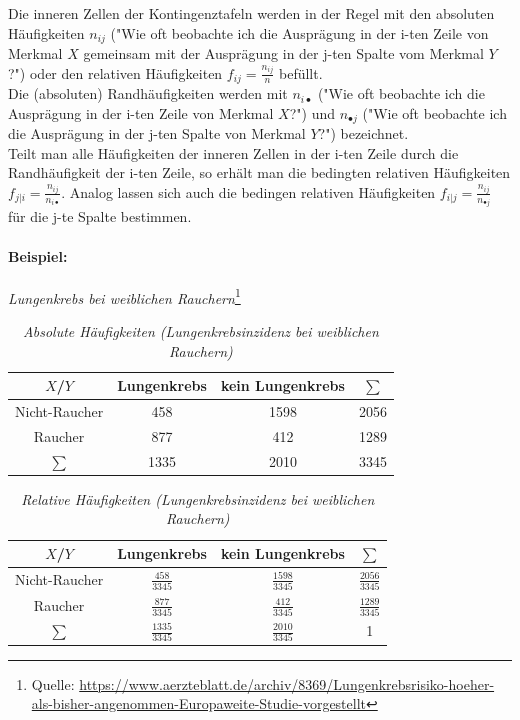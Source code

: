 \documentclass[a4paper]{article}
\begin{document}
Die inneren Zellen der Kontingenztafeln werden in der Regel mit den absoluten Häufigkeiten $n_{ij}$ ("Wie oft beobachte ich die Ausprägung in der i-ten Zeile von Merkmal $X$ gemeinsam mit der Ausprägung in der j-ten Spalte vom Merkmal $Y$?") oder den relativen Häufigkeiten $f_{ij} = \frac{n_{ij}}{n}$ befüllt.\\
Die (absoluten) Randhäufigkeiten werden mit $n_{i\bullet}$ ("Wie oft beobachte ich die Ausprägung in der i-ten Zeile von Merkmal $X$?") und $n_{\bullet j}$ ("Wie oft beobachte ich die Ausprägung in der j-ten Spalte von Merkmal $Y$?") bezeichnet.\\
Teilt man alle Häufigkeiten der inneren Zellen in der i-ten Zeile durch die Randhäufigkeit der i-ten Zeile, so erhält man die bedingten relativen Häufigkeiten $f_{j|i} = \frac{n_{ij}}{n_{i\bullet}}$. Analog lassen sich auch die bedingen relativen Häufigkeiten $f_{i|j} = \frac{n_{ij}}{n_{\bullet j}}$ für die j-te Spalte bestimmen.

\noindent \paragraph{Beispiel:} \textit{Lungenkrebs bei weiblichen Rauchern}\footnote{Quelle: \tiny{\url{https://www.aerzteblatt.de/archiv/8369/Lungenkrebsrisiko-hoeher-als-bisher-angenommen-Europaweite-Studie-vorgestellt}}}\\

\begin{table}[htbp]
\begin{tabular}{c|cc|c}
    $X$/$Y$         & Lungenkrebs & kein Lungenkrebs & $\sum$ \\
     \hline
    Nicht-Raucher   & 458         & 1598             & 2056 \\
    Raucher         & 877         & 412              & 1289 \\
    \hline
    $\sum$          & 1335        & 2010             & 3345
\end{tabular}
    \caption{\textit{Absolute Häufigkeiten (Lungenkrebsinzidenz bei weiblichen Rauchern)}}
    \label{tab:abs}
\end{table}

\begin{table}[htbp]
\begin{tabular}{c|cc|c}
    $X$/$Y$         & Lungenkrebs & kein Lungenkrebs & $\sum$ \\
     \hline
    Nicht-Raucher   & $\frac{458}{3345}$         & $\frac{1598}{3345}$             & $\frac{2056}{3345}$ \\
    Raucher         & $\frac{877}{3345}$         & $\frac{412}{3345}$              & $\frac{1289}{3345}$ \\
    \hline
    $\sum$          & $\frac{1335}{3345}$        & $\frac{2010}{3345}$             & 1
\end{tabular}
    \caption{\textit{Relative Häufigkeiten (Lungenkrebsinzidenz bei weiblichen Rauchern)}}
    \label{tab:rel}
\end{table}
\end{document}
